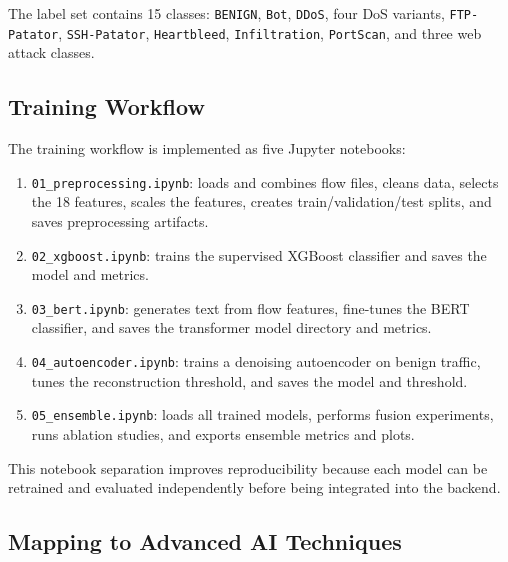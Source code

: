 \documentclass[12pt,a4paper]{article}
\begin{document}
The label set contains 15 classes: \texttt{BENIGN}, \texttt{Bot}, \texttt{DDoS}, four DoS variants, \texttt{FTP-Patator}, \texttt{SSH-Patator}, \texttt{Heartbleed}, \texttt{Infiltration}, \texttt{PortScan}, and three web attack classes.

\subsection{Training Workflow}

The training workflow is implemented as five Jupyter notebooks:

\begin{enumerate}[leftmargin=1.2cm]
    \item \texttt{01\_preprocessing.ipynb}: loads and combines flow files, cleans data, selects the 18 features, scales the features, creates train/validation/test splits, and saves preprocessing artifacts.
    \item \texttt{02\_xgboost.ipynb}: trains the supervised XGBoost classifier and saves the model and metrics.
    \item \texttt{03\_bert.ipynb}: generates text from flow features, fine-tunes the BERT classifier, and saves the transformer model directory and metrics.
    \item \texttt{04\_autoencoder.ipynb}: trains a denoising autoencoder on benign traffic, tunes the reconstruction threshold, and saves the model and threshold.
    \item \texttt{05\_ensemble.ipynb}: loads all trained models, performs fusion experiments, runs ablation studies, and exports ensemble metrics and plots.
\end{enumerate}

This notebook separation improves reproducibility because each model can be retrained and evaluated independently before being integrated into the backend.

\subsection{Mapping to Advanced AI Techniques}
\end{document}
